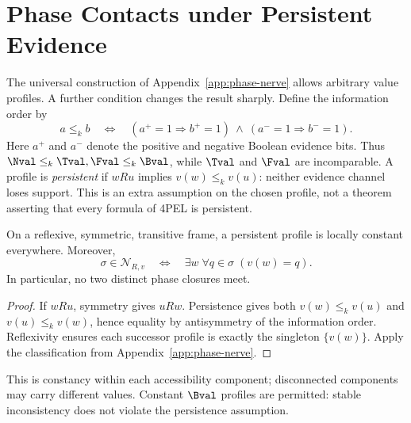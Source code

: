 \section{Phase Contacts under Persistent Evidence}
\label{app:persistent-phase-nerve}

The universal construction of Appendix~\ref{app:phase-nerve} allows arbitrary
value profiles. A further condition changes the result sharply. Define the
information order by
\[
 a\leq_k b\quad\Longleftrightarrow\quad
 (a^+=1\Rightarrow b^+=1)\ \wedge\ (a^-=1\Rightarrow b^-=1).
\]
Here $a^+$ and $a^-$ denote the positive and negative Boolean evidence bits.
Thus $\Nval\leq_k\Tval,\Fval\leq_k\Bval$, while $\Tval$ and $\Fval$ are
incomparable. A profile is \emph{persistent} if $wRu$ implies
$v(w)\leq_k v(u)$: neither evidence channel loses support.
This is an extra assumption on the chosen profile, not a theorem asserting
that every formula of 4PEL is persistent.

\begin{theorem}
On a reflexive, symmetric, transitive frame, a persistent profile is locally
constant everywhere. Moreover,
\[
 \sigma\in\mathcal N_{R,v}
 \quad\Longleftrightarrow\quad
 \exists w\;\forall q\in\sigma\;(v(w)=q).
\]
In particular, no two distinct phase closures meet.
\end{theorem}
\begin{proof}
If $wRu$, symmetry gives $uRw$. Persistence gives both
$v(w)\leq_k v(u)$ and $v(u)\leq_k v(w)$, hence equality by antisymmetry of
the information order. Reflexivity ensures each successor profile is exactly
the singleton $\{v(w)\}$. Apply the classification from Appendix~\ref{app:phase-nerve}.
\end{proof}

This is constancy within each accessibility component; disconnected components
may carry different values. Constant $\Bval$ profiles are permitted: stable
inconsistency does not violate the persistence assumption.

